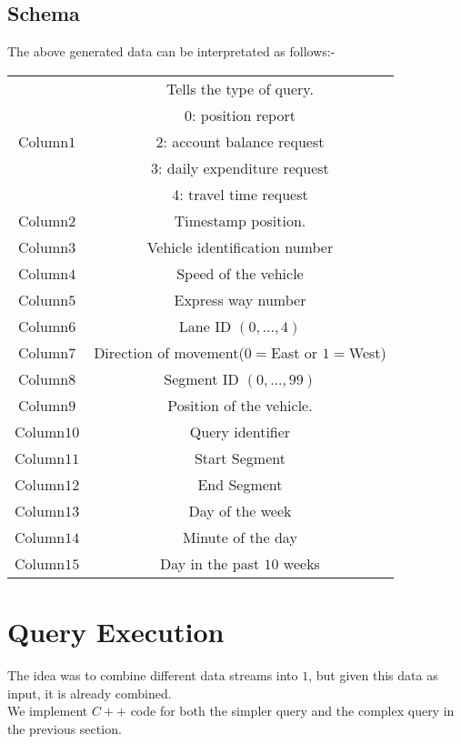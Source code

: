 \subsection{Schema}
The above generated data can be interpretated as follows:-
\begin{center}
\begin{tabular}{ |c|c| } 
 \hline
  \multirow{5}{4em}{Column$1$} & Tells the type of query. \\  
            &	0: position report\\
			&	2: account balance request\\
			&	3: daily expenditure request\\
			&	4: travel time request	\\
 \hline
  Column$2$ & Timestamp position. \\  
 \hline
  Column$3$ & Vehicle identification number\\  
 \hline
  Column$4$ & Speed of the vehicle \\  
 \hline
  Column$5$ & Express way number \\  
 \hline
  Column$6$ & Lane ID $(0,...,4)$\\  
 \hline
  Column$7$ & Direction of movement($0=$East or $1=$West) \\  
 \hline
  Column$8$ & Segment ID $(0,...,99)$ \\
 \hline
  Column$9$ & Position of the vehicle. \\  
 \hline
  Column$10$ & Query identifier \\  
 \hline
  Column$11$ & Start Segment \\  
 \hline
  Column$12$ & End Segment \\  
 \hline
  Column$13$ & Day of the week \\  
 \hline
  Column$14$ & Minute of the day \\  
 \hline
  Column$15$ & Day in the past $10$ weeks \\  
 \hline
\end{tabular}
\end{center}

\section{Query Execution}
The idea was to combine different data streams into $1$, but given this data as input, it is already combined.\\
We implement $C++$ code for both the simpler query and the complex query in the previous section.
